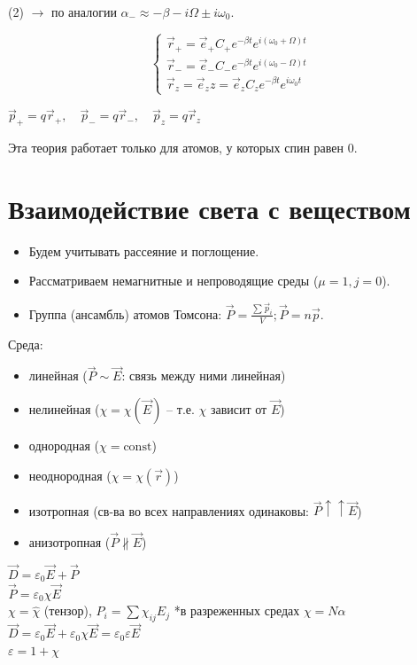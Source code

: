 (2) $\to$ по аналогии $\alpha_- \approx -\beta - i\Omega \pm i\omega_0$.

\begin{equation}
	\begin{cases}
		\vec{r}_+ = \vec{e}_+ C_+ e^{-\beta t} e^{i(\omega_0 + \Omega)t} \\
		\vec{r}_- = \vec{e}_- C_- e^{-\beta t} e^{i(\omega_0 - \Omega)t} \\
		\vec{r}_z = \vec{e}_z z = \vec{e}_z C_z e^{-\beta t} e^{i\omega_0 t}
	\end{cases}
\end{equation}

$\vec{p}_+ = q\vec{r}_+, \quad \vec{p}_- = q\vec{r}_-, \quad \vec{p}_z = q\vec{r}_z$

\begin{nb}
	Эта теория работает только для атомов, у которых спин равен 0.
\end{nb}

\section{Взаимодействие света с веществом}

\begin{itemize}
	\item Будем учитывать рассеяние и поглощение.
	\item Рассматриваем немагнитные и непроводящие среды ($\mu=1, j=0$).
	\item Группа (ансамбль) атомов Томсона: $\vec{P} = \frac{\sum \vec{p}_i}{V} ; \vec{P} = n \vec{p}$.
\end{itemize}

Среда:
\begin{itemize}
	\item линейная ($\vec{P} \sim \vec{E}$: связь между ними линейная)
	\item нелинейная ($\chi = \chi(\vec{E})$ -- т.е. $\chi$ зависит от $\vec{E}$)
	\item однородная ($\chi = \text{const}$)
	\item неоднородная ($\chi = \chi(\vec{r})$)
	\item изотропная (св-ва во всех направлениях одинаковы: $\vec{P} \uparrow\uparrow \vec{E}$)
	\item анизотропная ($\vec{P} \not\parallel \vec{E}$)
\end{itemize}

$\vec{D} = \varepsilon_0 \vec{E} + \vec{P}$ \\
$\vec{P} = \varepsilon_0 \chi \vec{E}$ \\
$\chi = \hat{\chi}$ (тензор), $P_i = \sum \chi_{ij} E_j$ *в разреженных средах $\chi = N\alpha$ \\
$\vec{D} = \varepsilon_0 \vec{E} + \varepsilon_0 \chi \vec{E} = \varepsilon_0 \varepsilon \vec{E}$ \\
$\varepsilon = 1 + \chi$

